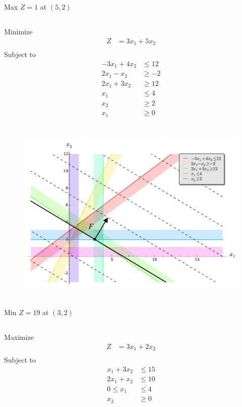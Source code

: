 \documentclass[12pt]{article}
\begin{document}
Max $Z=1$ at $\left(5,2\right)$

\newpage
\subsection{}

Minimize 
\begin{align*}
Z              & = 3 x_1+5 x_2 \\
\end{align*}
Subject to 
\begin{align*}
-3 x_1 + 4 x_2 & \le 12        \\
2 x_1 - x_2    & \ge -2        \\
2 x_1 + 3 x_2  & \ge 12        \\
 x_1           & \le 4         \\
 x_2           & \ge 2         \\
 x_1           & \ge 0         \\
\end{align*}

 \begin{figure}[H]
    \centering
\includegraphics[height=3.5in]{./images/p3_7.pdf}
\end{figure}
Min $Z=19$ at $\left(3,2\right)$

\newpage
\subsection{}
Maximize 
\begin{align*}
Z            & = 3 x_1 + 2 x_2 \\
\end{align*}
Subject to 
\begin{align*}
x_1 + 3 x_2  & \le 15          \\
2 x_1 +  x_2 & \le 10          \\
0 \le x_1    & \le 4           \\
x_2          & \ge 0
\end{align*}
\end{document}
